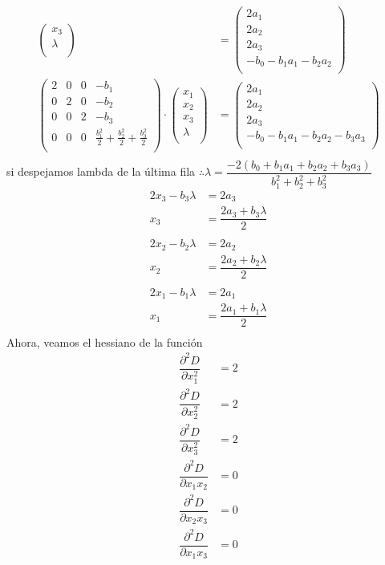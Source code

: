 \documentclass[letterpaper]{article}
\renewcommand{\d}{\partial}
\renewcommand{\*}{\cdot}
\theoremstyle{definition}
\begin{document}
\begin{align*}
\begin{pmatrix}
	x_3\\
	\lambda\\
	\end{pmatrix} &= \begin{pmatrix}
	2a_1\\
	2a_2\\
	2a_3\\
	-b_0 - b_1a_1 - b_2a_2\\
	\end{pmatrix}\\ %
	\begin{pmatrix}
	2 & 0 & 0 & -b_1 \\
	0 & 2 & 0 & -b_2 \\
	0 & 0 & 2 & -b_3 \\
	0 & 0 & 0 & \frac{b_1^2}{2} + \frac{b_2^2}{2} + \frac{b_3^2}{2} \\
	\end{pmatrix} \* \begin{pmatrix}
	x_1\\
	x_2\\
	x_3\\
	\lambda\\
	\end{pmatrix} &= \begin{pmatrix}
	2a_1\\
	2a_2\\
	2a_3\\
	-b_0 - b_1a_1 - b_2a_2 - b_3a_3\\
	\end{pmatrix}\\ %
\end{align*}
si despejamos lambda de la última fila $ \therefore \lambda = \dfrac{-2(b_0 + b_1 a_1 + b_2 a_2 + b_3 a_3)}{b_1^2 + b_2^2 + b_3^2} $
\begin{align*}
	2x_3 - b_3 \lambda &= 2a_3\\
	x_3 &= \dfrac{2a_3 + b_3 \lambda}{2} \\
	\\
	2x_2 - b_2 \lambda &= 2a_2\\
	x_2 &= \dfrac{2a_2 + b_2 \lambda}{2} \\
	\\
	2x_1 - b_1 \lambda &= 2a_1\\
	x_1 &= \dfrac{2a_1 + b_1 \lambda}{2} \\
\end{align*}
Ahora, veamos el hessiano de la función
\begin{align*}
	\dfrac{\d^2 D}{\d x_1^2} &= 2\\
	\dfrac{\d^2 D}{\d x_2^2} &= 2\\
	\dfrac{\d^2 D}{\d x_3^2} &= 2\\
	\dfrac{\d^2 D}{\d x_1x_2} &= 0\\
	\dfrac{\d^2 D}{\d x_2x_3} &= 0\\
	\dfrac{\d^2 D}{\d x_1x_3} &= 0\\
\end{align*}
\end{document}
